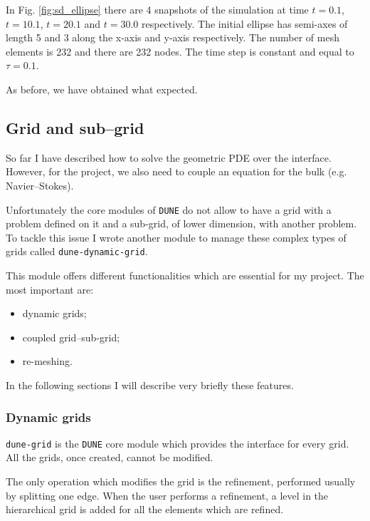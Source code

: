 \documentclass[a4paper,11pt, onecolumn]{article}
\begin{document}
In Fig. \ref{fig:sd_ellipse} there are 4 snapshots of the simulation at time
$t=0.1$, $t=10.1$, $t=20.1$ and $t=30.0$ respectively. The initial ellipse has
semi-axes of length 5 and 3 along the x-axis and y-axis respectively. The number
of mesh elements is 232 and there are 232 nodes. The time step is constant and
equal to $\tau=0.1$.
\newline

As before, we have obtained what expected.

\subsection{Grid and sub--grid}

So far I have described how to solve the geometric PDE over the interface.
However, for the project, we also need to couple an equation for the bulk (e.g.
Navier--Stokes).

Unfortunately the core modules of \verb|DUNE| do not allow to have a grid with a
problem defined on it and a sub-grid, of lower dimension, with another problem.
To tackle this issue I wrote another module to manage these complex types of
grids called \verb|dune-dynamic-grid|.
\newline

This module offers different functionalities which are essential for my
project. The most important are:
\begin{itemize}
 \item dynamic grids;
 \item coupled grid--sub-grid;
 \item re-meshing.
\end{itemize}

In the following sections I will describe very briefly these features.

\subsubsection{Dynamic grids}

\verb|dune-grid| is the \verb|DUNE| core module which provides the interface for
every grid. All the grids, once created, cannot be modified.

The only operation which modifies the grid is the refinement, performed usually
by splitting one edge. When the user performs a refinement, a level in the
hierarchical grid is added for all the elements which are refined.
\newline
\end{document}
